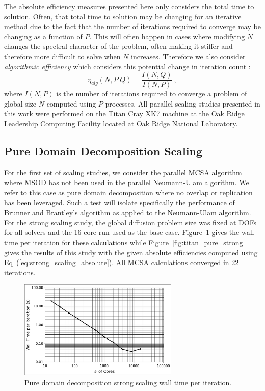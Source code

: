 \documentclass{snamc2013}
\begin{document}
The absolute efficiency measures presented here only considers the
total time to solution. Often, that total time to solution may be
changing for an iterative method due to the fact that the number of
iterations required to converge may be changing as a function of
$P$. This will often happen in cases where modifying $N$ changes the
spectral character of the problem, often making it stiffer and
therefore more difficult to solve when $N$ increases. Therefore we
also consider \textit{algorithmic efficiency} which considers this
potential change in iteration count \cite{keyes_how_1999}:
\begin{equation}
  \eta_{alg}(N,P|Q) = \frac{I(N,Q)}{I(N,P)}\:,
  \label{eq:algorithmic_efficiency}
\end{equation}
where $I(N,P)$ is the number of iterations required to converge a
problem of global size $N$ computed using $P$ processes.  All parallel
scaling studies presented in this work were performed on the Titan
Cray XK7 machine at the Oak Ridge Leadership Computing Facility
located at Oak Ridge National Laboratory.

\subsection{Pure Domain Decomposition Scaling}
\label{subsec:pure_domain_decomp}
For the first set of scaling studies, we consider the parallel MCSA
algorithm where MSOD has not been used in the parallel Neumann-Ulam
algorithm. We refer to this case as pure domain decomposition where no
overlap or replication has been leveraged. Such a test will isolate
specifically the performance of Brunner and Brantley's algorithm as
applied to the Neumann-Ulam algorithm. For the strong scaling study,
the global diffusion problem size was fixed at  DOFs for
all solvers and the 16 core run used as the base
case. Figure~\ref{fig:titan_pure_strong_time} gives the wall time per
iteration for these calculations while
Figure~\ref{fig:titan_pure_strong} gives the results of this study
with the given absolute efficiencies computed using
Eq~(\ref{eq:strong_scaling_absolute}). All MCSA calculations converged
in 22 iterations.

\begin{figure}[h!]
  \begin{center}
    \includegraphics[width=3in]{titan_pure_strong_time.pdf}
  \end{center}
  \caption{Pure domain decomposition strong scaling wall time per
    iteration.}
  \label{fig:titan_pure_strong_time}
\end{figure}
\end{document}
